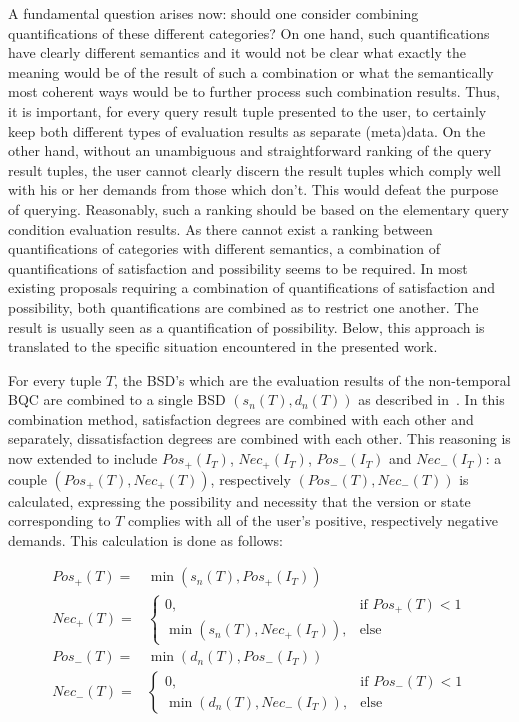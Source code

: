 \documentclass[runningheads,a4paper]{llncs}
\begin{document}
A fundamental question arises now: should one consider combining quantifications of these different categories? On one hand, such quantifications have clearly different semantics and it would not be clear what exactly the meaning would be of the result of such a combination or what the semantically most coherent ways would be to further process such combination results. Thus, it is important, for every query result tuple presented to the user, to certainly keep both different types of evaluation results as separate (meta)data. On the other hand, without an unambiguous and straightforward ranking of the query result tuples, the user cannot clearly discern the result tuples which comply well with his or her demands from those which don't. This would defeat the purpose of querying. Reasonably, such a ranking should be based on the elementary query condition evaluation results. As there cannot exist a ranking between quantifications of categories with different semantics, a combination of quantifications of satisfaction and possibility seems to be required. In most existing proposals requiring a combination of quantifications of satisfaction and possibility, both quantifications are combined as to restrict one another. The result is usually seen as a quantification of possibility. Below, this approach is translated to the specific situation encountered in the presented work.

For every tuple $T$, the BSD's which are the evaluation results of the non-temporal BQC are combined to a single BSD $(s_n(T), d_n(T))$ as described in~\cite{Matthe2011ijis}. In this combination method, satisfaction degrees are combined with each other and separately, dissatisfaction degrees are combined with each other. This reasoning is now extended to include $Pos_{+}(I_{T})$, $Nec_{+}(I_{T})$, $Pos_{-}(I_{T})$ and $Nec_{-}(I_{T})$: a couple $(Pos_{+}(T), Nec_{+}(T))$, respectively $(Pos_{-}(T), Nec_{-}(T))$ is calculated, expressing the possibility and necessity that the version or state corresponding to $T$ complies with all of the user's positive, respectively negative demands. This calculation is done as follows:

\vspace{-10pt}
\begin{align}
Pos_{+}(T) = & \min(s_n(T), Pos_{+}(I_{T})) \nonumber \\
Nec_{+}(T) = &
	\begin{cases}
	0, & \text{if } Pos_{+}(T) < 1 \\
	\min(s_n(T), Nec_{+}(I_{T})), & \text{else}
	\end{cases}
	\nonumber \\
Pos_{-}(T) = & \min(d_n(T), Pos_{-}(I_{T})) \nonumber \\
Nec_{-}(T) = &
	\begin{cases}
	0, & \text{if } Pos_{-}(T) < 1 \\
	\min(d_n(T), Nec_{-}(I_{T})), & \text{else}
	\end{cases}
	\nonumber
\end{align}
\end{document}

